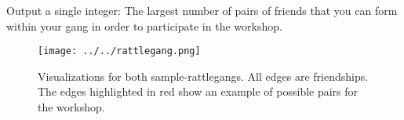 Output a single integer: The largest number of pairs of friends that you can form within your gang in order to participate in the workshop. 

\begin{samples}
\end{samples}

\begin{figure}[h]
\texttt{[image: ../../rattlegang.png]}
\caption{Visualizations for both sample-rattlegangs. All edges are friendships. The edges highlighted in red show an example of possible pairs for the workshop.}
\end{figure}


